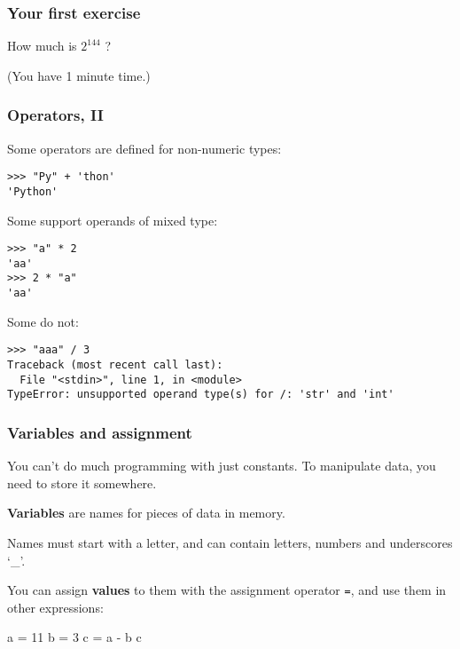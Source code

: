 \documentclass[english,serif,mathserif,xcolor=pdftex,dvipsnames,table]{beamer}
\begin{document}
\begin{frame}
  \frametitle{Your first exercise}
    \begin{center}
      {\Large How much is \href{http://www.pythonchallenge.com}{$2^{144}$} ?}

      \+ (You have 1 minute time.)
    \end{center}
\end{frame}


\begin{frame}[fragile]
  \frametitle{Operators, II}
  \smaller

  Some operators are defined for non-numeric types:
\begin{lstlisting}
>>> "Py" + 'thon'
'Python'
\end{lstlisting}

  \+
  Some support operands of mixed type:
\begin{lstlisting}
>>> "a" * 2
'aa'
>>> 2 * "a"
'aa'
\end{lstlisting}

  \+
  Some do not:
\begin{lstlisting}[basicstyle=\footnotesize\ttfamily]
>>> "aaa" / 3
Traceback (most recent call last):
  File "<stdin>", line 1, in <module>
TypeError: unsupported operand type(s) for /: 'str' and 'int'
\end{lstlisting}
\end{frame}


\begin{frame}[fragile]
  \frametitle{Variables and assignment}

  You can't do much programming with just constants.
  To manipulate data, you need to store it somewhere.

  \+
  \textbf{Variables} are names for pieces of data in memory.

  \+
  Names must start with a letter, and can contain letters, numbers and underscores `\_'.

  \+
  You can assign \textbf{values} to them with the assignment operator \texttt{=},
  and use them in other expressions:

\begin{semiverbatim}
\In a = 11
\In b = 3
\In c = a - b
\In c
\end{semiverbatim}
\end{frame}
\end{document}
